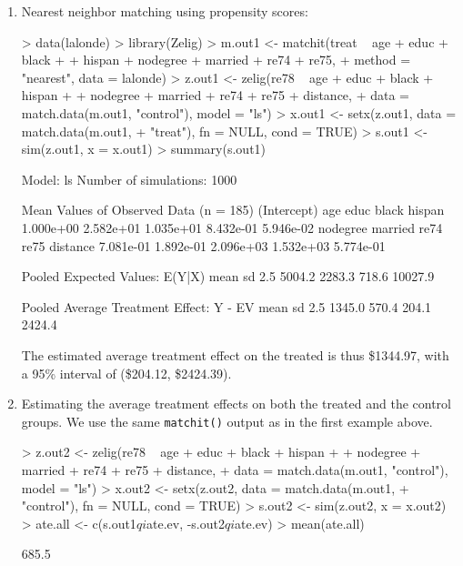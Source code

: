 \begin{enumerate}
\item Nearest neighbor matching using propensity scores: 

\begin{Schunk}
\begin{Sinput}
> data(lalonde)
> library(Zelig)
> m.out1 <- matchit(treat ~ age + educ + black + 
+     hispan + nodegree + married + re74 + re75, 
+     method = "nearest", data = lalonde)
> z.out1 <- zelig(re78 ~ age + educ + black + hispan + 
+     nodegree + married + re74 + re75 + distance, 
+     data = match.data(m.out1, "control"), model = "ls")
> x.out1 <- setx(z.out1, data = match.data(m.out1, 
+     "treat"), fn = NULL, cond = TRUE)
> s.out1 <- sim(z.out1, x = x.out1)
> summary(s.out1)
\end{Sinput}
\begin{Soutput}
  Model: ls 
  Number of simulations: 1000 

Mean Values of Observed Data (n = 185) 
(Intercept)         age        educ       black      hispan 
  1.000e+00   2.582e+01   1.035e+01   8.432e-01   5.946e-02 
   nodegree     married        re74        re75    distance 
  7.081e-01   1.892e-01   2.096e+03   1.532e+03   5.774e-01 

Pooled Expected Values: E(Y|X)
   mean      sd    2.5%   97.5% 
 5004.2  2283.3   718.6 10027.9 

Pooled Average Treatment Effect: Y - EV
  mean     sd   2.5%  97.5% 
1345.0  570.4  204.1 2424.4 
\end{Soutput}
\end{Schunk}
  
The estimated average treatment effect on the treated is thus 
\$1344.97, 
with a 95\% interval
of (\$204.12, 
\$2424.39).

\item Estimating the average treatment effects on both the treated and
  the control groups. We use the same {\tt matchit()} output as in the
  first example above.

\begin{Schunk}
\begin{Sinput}
> z.out2 <- zelig(re78 ~ age + educ + black + hispan + 
+     nodegree + married + re74 + re75 + distance, 
+     data = match.data(m.out1, "control"), model = "ls")
> x.out2 <- setx(z.out2, data = match.data(m.out1, 
+     "control"), fn = NULL, cond = TRUE)
> s.out2 <- sim(z.out2, x = x.out2)
> ate.all <- c(s.out1$qi$ate.ev, -s.out2$qi$ate.ev)
> mean(ate.all)
\end{Sinput}
\begin{Soutput}
[1] 685.5


\end{Soutput}
\end{Schunk}
\end{enumerate}
